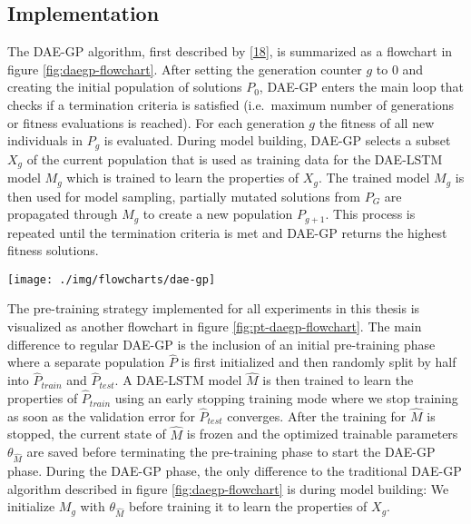 \documentclass[
  11pt,
]{article}
\let\origfigure\figure
\let\endorigfigure\endfigure
\renewenvironment{figure}[1][2] {
    \expandafter\origfigure\expandafter[H]
} {
    \endorigfigure
}
\begin{document}
\hypertarget{implementation}{%
\subsection{Implementation}\label{implementation}}

The DAE-GP algorithm, first described by {[}\protect\hyperlink{ref-dae-gp_2020_rtree}{18}{]}, is summarized as a flowchart in figure \ref{fig:daegp-flowchart}.
After setting the generation counter \(g\) to \(0\) and creating the initial population of solutions \(P_0\), DAE-GP enters the main loop that checks if a termination criteria is satisfied (i.e.~maximum number of generations or fitness evaluations is reached).
For each generation \(g\) the fitness of all new individuals in \(P_g\) is evaluated. During model building, DAE-GP selects a subset \(X_g\) of the current population that is used as training data for the DAE-LSTM model \(M_g\) which is trained to learn the properties of \(X_g\).
The trained model \(M_g\) is then used for model sampling, partially mutated solutions from \(P_G\) are propagated through \(M_g\) to create a new population \(P_{g+1}\).
This process is repeated until the termination criteria is met and DAE-GP returns the highest fitness solutions.

\begin{figure}[c]

{\centering \texttt{[image: ./img/flowcharts/dae-gp]} 

}

\caption{Regular DAE-GP Flowchart}\label{fig:daegp-flowchart}
\end{figure}

The pre-training strategy implemented for all experiments in this thesis is visualized as another flowchart in figure \ref{fig:pt-daegp-flowchart}.
The main difference to regular DAE-GP is the inclusion of an initial pre-training phase where a separate population \(\hat{P}\) is first initialized and then randomly split by half into \(\hat{P}_{train}\) and \(\hat{P}_{test}\).
A DAE-LSTM model \(\hat{M}\) is then trained to learn the properties of \(\hat{P}_{train}\) using an early stopping training mode where we stop training as soon as the validation error for \(\hat{P}_{test}\) converges.
After the training for \(\hat{M}\) is stopped, the current state of \(\hat{M}\) is frozen and the optimized trainable parameters \(\theta_{\hat{M}}\) are saved before terminating the pre-training phase to start the DAE-GP phase.
During the DAE-GP phase, the only difference to the traditional DAE-GP algorithm described in figure \ref{fig:daegp-flowchart} is during model building: We initialize \(M_g\) with \(\theta_{\hat{M}}\) before training it to learn the properties of \(X_g\).
\end{document}
